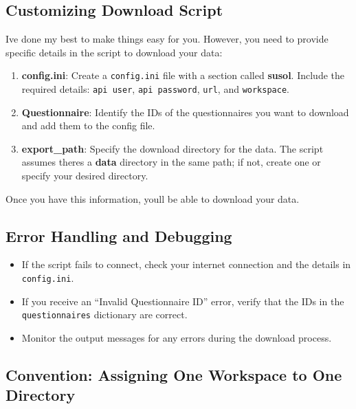 \documentclass[
  letterpaper,
  DIV=11,
  numbers=noendperiod]{scrreprt}
\begin{document}
\subsection{Customizing Download
Script}\label{customizing-download-script}

I\textquotesingle ve done my best to make things easy for you. However,
you need to provide specific details in the script to download your
data:

\begin{enumerate}
\def\labelenumi{\arabic{enumi}.}
\item
  \textbf{config.ini}: Create a \texttt{config.ini} file with a section
  called \textbf{susol}. Include the required details:
  \texttt{api\ user}, \texttt{api\ password}, \texttt{url}, and
  \texttt{workspace}.
\item
  \textbf{Questionnaire}: Identify the IDs of the questionnaires you
  want to download and add them to the config file.
\item
  \textbf{export\_path}: Specify the download directory for the data.
  The script assumes there\textquotesingle s a \textbf{data} directory
  in the same path; if not, create one or specify your desired
  directory.
\end{enumerate}

Once you have this information, you\textquotesingle ll be able to
download your data.

\subsection{Error Handling and
Debugging}\label{error-handling-and-debugging}

\begin{itemize}
\item
  If the script fails to connect, check your internet connection and the
  details in \texttt{config.ini}.
\item
  If you receive an ``Invalid Questionnaire ID'' error, verify that the
  IDs in the \texttt{questionnaires} dictionary are correct.
\item
  Monitor the output messages for any errors during the download
  process.
\end{itemize}

\subsection{Convention: Assigning One Workspace to One
Directory}\label{convention-assigning-one-workspace-to-one-directory}
\end{document}
